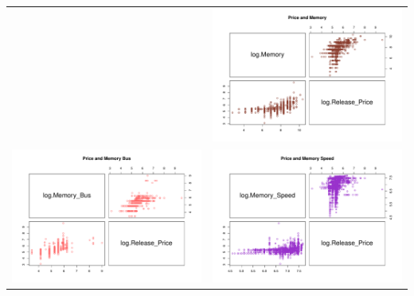 \documentclass[a4paper]{article}
\begin{document}
\begin{center}
\begin{adjustbox}{width=\textwidth}
\begin{tabular}{cc}
        &\includegraphics[keepaspectratio, width=1\textwidth, height=1\textheight]{Visualization/Pairs/price_memory.pdf}\\
        \includegraphics[keepaspectratio, width=1\textwidth, height=1\textheight]{Visualization/Pairs/price_memorybus.pdf}
        &\includegraphics[keepaspectratio, width=1\textwidth, height=1\textheight]{Visualization/Pairs/price_memoryspeed.pdf}\\

\end{tabular}
\end{adjustbox}
\end{center}
\end{document}
